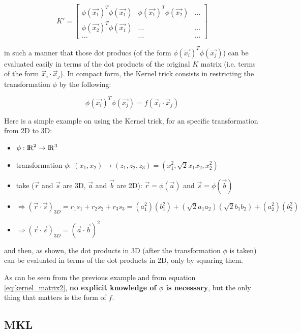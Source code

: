 \documentclass[paper=a4, fontsize=11pt]{scrartcl} %
\numberwithin{equation}{section} %
\numberwithin{figure}{section} %
\numberwithin{table}{section} %
\begin{document}
\[
K'=
  \begin{bmatrix}
    \phi(\vec{x_{1}})^{T}\phi(\vec{x_{1}}) & \phi(\vec{x_{1}})^{T}\phi(\vec{x_{2}}) & ...  \\
    \phi(\vec{x_{2}})^{T}\phi(\vec{x_{1}}) & ... & ...  \\
    ... & ... & ...
  \end{bmatrix}
\]

in such a manner that those dot producs (of the form $\phi(\vec{x_{i}})^{T}\phi(\vec{x_{j}})$) can be evaluated easily in terms of the dot products of the original $K$ matrix (i.e. terms of the form $\vec{x}_{i}\cdot \vec{x}_{j}$). In compact form, the Kernel trick consists in restricting the transformation $\phi$ by the following:

\begin{equation}
\phi(\vec{x_{i}})^{T}\phi(\vec{x_{j}}) = f(\vec{x}_{i}\cdot \vec{x}_{j})
\label{eq:kernel_matrix2}
\end{equation}


Here is a simple example on using the Kernel trick, for an specific transformation from 2D to 3D:

\begin{itemize}
\item $\phi: {\rm I\!R}^{2}\rightarrow {\rm I\!R}^{3}$
\item transformation $\phi$: $(x_{1}, x_{2})\rightarrow (z_{1}, z_{2}, z_{3}) = (x_{1}^{2}, \sqrt{2}x_{1}x_{2}, x_{2}^{2})$
\item take ($\vec{r}$ and $\vec{s}$ are 3D, $\vec{a}$ and $\vec{b}$ are 2D): $\vec{r} = \phi(\vec{a})$ and $\vec{s} = \phi(\vec{b})$
\item $\Rightarrow (\vec{r}\cdot\vec{s})_{3D} = r_{1}s_{1}+r_{2}s_{2}+r_{3}s_{3} = (a_{1}^{2})(b_{1}^{2})+(\sqrt{2}a_{1}a_{2})(\sqrt{2}b_{1}b_{2})+(a_{2}^{2})(b_{2}^{2})$
\item $\Rightarrow (\vec{r}\cdot\vec{s})_{3D} = (\vec{a}\cdot\vec{b})^{2}$
\end{itemize}

and then, as shown, the dot products in 3D (after the transformation $\phi$ is taken) can be evaluated in terms of the dot products in 2D, only by squaring them.

As can be seen from the previous example and from equation \ref{eq:kernel_matrix2}, \textbf{no explicit knowledge of $\phi$ is necessary}, but the only thing that matters is the form of $f$.

\subsection{MKL}
\end{document}
